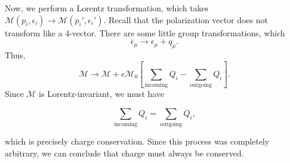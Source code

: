 \documentclass[11pt]{article}
\theoremstyle{definition}
\begin{document}
Now, we perform a Lorentz transformation, which takes $\mathcal{M}(p_i, \epsilon_i) \rightarrow \mathcal{M}(p_i', \epsilon_i')$. Recall that the polarization vector does not transform like a 4-vector. There are some little group transformations, which
\begin{equation}
    \epsilon_\mu \rightarrow \epsilon_\mu + q_\mu.
\end{equation}
Thus, 
\begin{equation}
    \mathcal{M} \rightarrow \mathcal{M} + e\mathcal{M}_0\left[ \sum_\text{incoming}Q_i - \sum_\text{outgoing}Q_i \right].
\end{equation}
Since $\mathcal{M}$ is Lorentz-invariant, we must have
\begin{shaded}
    \begin{equation}
         \sum_\text{incoming}Q_i = \sum_\text{outgoing}Q_i,
    \end{equation}
\end{shaded}
which is precisely charge conservation. Since this process was completely arbitrary, we can conclude that charge must always be conserved.
\end{document}

